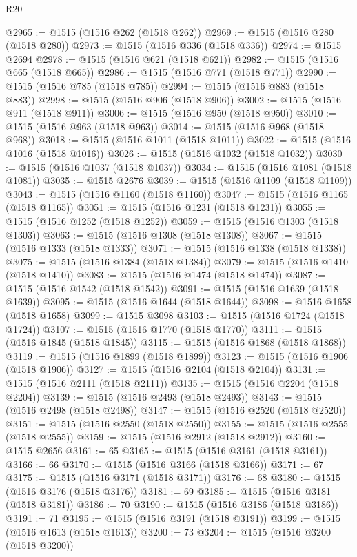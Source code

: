 \begin{lexlean}{R20}
\begin{coremodule}
{@2965 := @1515 (@1516 @262 (@1518 @262))
@2969 := @1515 (@1516 @280 (@1518 @280))
@2973 := @1515 (@1516 @336 (@1518 @336))
@2974 := @1515 @2694
@2978 := @1515 (@1516 @621 (@1518 @621))
@2982 := @1515 (@1516 @665 (@1518 @665))
@2986 := @1515 (@1516 @771 (@1518 @771))
@2990 := @1515 (@1516 @785 (@1518 @785))
@2994 := @1515 (@1516 @883 (@1518 @883))
@2998 := @1515 (@1516 @906 (@1518 @906))
@3002 := @1515 (@1516 @911 (@1518 @911))
@3006 := @1515 (@1516 @950 (@1518 @950))
@3010 := @1515 (@1516 @963 (@1518 @963))
@3014 := @1515 (@1516 @968 (@1518 @968))
@3018 := @1515 (@1516 @1011 (@1518 @1011))
@3022 := @1515 (@1516 @1016 (@1518 @1016))
@3026 := @1515 (@1516 @1032 (@1518 @1032))
@3030 := @1515 (@1516 @1037 (@1518 @1037))
@3034 := @1515 (@1516 @1081 (@1518 @1081))
@3035 := @1515 @2676
@3039 := @1515 (@1516 @1109 (@1518 @1109))
@3043 := @1515 (@1516 @1160 (@1518 @1160))
@3047 := @1515 (@1516 @1165 (@1518 @1165))
@3051 := @1515 (@1516 @1231 (@1518 @1231))
@3055 := @1515 (@1516 @1252 (@1518 @1252))
@3059 := @1515 (@1516 @1303 (@1518 @1303))
@3063 := @1515 (@1516 @1308 (@1518 @1308))
@3067 := @1515 (@1516 @1333 (@1518 @1333))
@3071 := @1515 (@1516 @1338 (@1518 @1338))
@3075 := @1515 (@1516 @1384 (@1518 @1384))
@3079 := @1515 (@1516 @1410 (@1518 @1410))
@3083 := @1515 (@1516 @1474 (@1518 @1474))
@3087 := @1515 (@1516 @1542 (@1518 @1542))
@3091 := @1515 (@1516 @1639 (@1518 @1639))
@3095 := @1515 (@1516 @1644 (@1518 @1644))
@3098 := @1516 @1658 (@1518 @1658)
@3099 := @1515 @3098
@3103 := @1515 (@1516 @1724 (@1518 @1724))
@3107 := @1515 (@1516 @1770 (@1518 @1770))
@3111 := @1515 (@1516 @1845 (@1518 @1845))
@3115 := @1515 (@1516 @1868 (@1518 @1868))
@3119 := @1515 (@1516 @1899 (@1518 @1899))
@3123 := @1515 (@1516 @1906 (@1518 @1906))
@3127 := @1515 (@1516 @2104 (@1518 @2104))
@3131 := @1515 (@1516 @2111 (@1518 @2111))
@3135 := @1515 (@1516 @2204 (@1518 @2204))
@3139 := @1515 (@1516 @2493 (@1518 @2493))
@3143 := @1515 (@1516 @2498 (@1518 @2498))
@3147 := @1515 (@1516 @2520 (@1518 @2520))
@3151 := @1515 (@1516 @2550 (@1518 @2550))
@3155 := @1515 (@1516 @2555 (@1518 @2555))
@3159 := @1515 (@1516 @2912 (@1518 @2912))
@3160 := @1515 @2656
@3161 := 65
@3165 := @1515 (@1516 @3161 (@1518 @3161))
@3166 := 66
@3170 := @1515 (@1516 @3166 (@1518 @3166))
@3171 := 67
@3175 := @1515 (@1516 @3171 (@1518 @3171))
@3176 := 68
@3180 := @1515 (@1516 @3176 (@1518 @3176))
@3181 := 69
@3185 := @1515 (@1516 @3181 (@1518 @3181))
@3186 := 70
@3190 := @1515 (@1516 @3186 (@1518 @3186))
@3191 := 71
@3195 := @1515 (@1516 @3191 (@1518 @3191))
@3199 := @1515 (@1516 @1613 (@1518 @1613))
@3200 := 73
@3204 := @1515 (@1516 @3200 (@1518 @3200))
}
\end{coremodule}
\end{lexlean}

